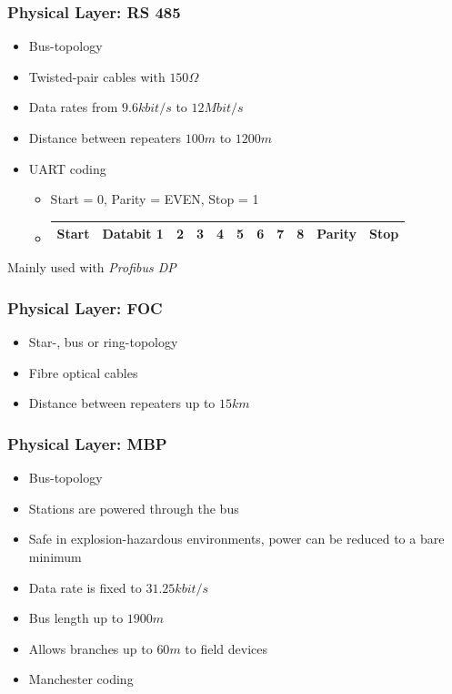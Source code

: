 \documentclass{beamer}
\begin{document}
\begin{frame}
  \frametitle{Physical Layer: RS 485}
  \begin{itemize}
    \item Bus-topology
    \item Twisted-pair cables with $150\Omega$
    \item Data rates from $9.6kbit/s$ to $12Mbit/s$
    \item Distance between repeaters $100m$ to $1200m$
    \item UART coding \\
      \footnotesize
      \begin{itemize}
        \item Start = 0, Parity = EVEN, Stop = 1 \\
        \item
          \begin{tabular}[h]{|c|c|c|c|c|c|c|c|c|c|c|}
            \hline
            Start & Databit 1 & 2 & 3 & 4 & 5 & 6 & 7 & 8 & Parity & Stop \\
            \hline
          \end{tabular}
      \end{itemize}
  \end{itemize}
  Mainly used with \textit{Profibus DP}
\end{frame}

\begin{frame}
  \frametitle{Physical Layer: FOC}
  \begin{itemize}
    \item Star-, bus or ring-topology
    \item Fibre optical cables
    \item Distance between repeaters up to $15km$
  \end{itemize}
\end{frame}

\begin{frame}
  \frametitle{Physical Layer: MBP}
  \begin{itemize}
    \item Bus-topology
    \item Stations are powered through the bus
    \item Safe in explosion-hazardous environments, power can be reduced to a bare minimum
    \item Data rate is fixed to $31.25kbit/s$
    \item Bus length up to $1900m$
    \item Allows branches up to $60m$ to field devices
    \item Manchester coding
  \end{itemize}
\end{frame}
\end{document}
